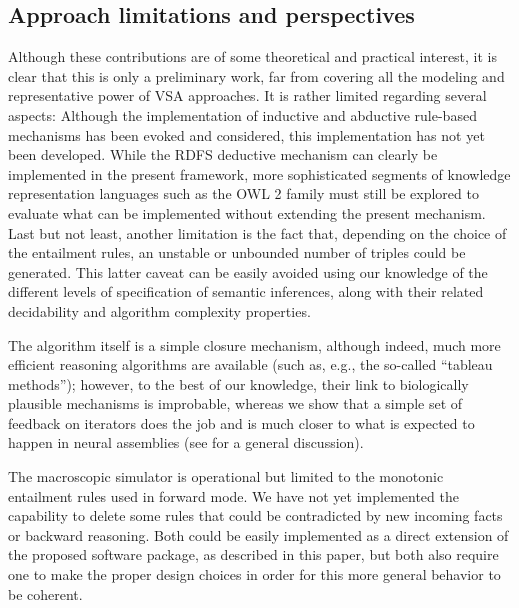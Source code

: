 \documentclass[sn-mathphys]{sn-jnl}
\begin{document}
\subsection{Approach limitations and perspectives}

Although these contributions are of some theoretical and practical interest, it is clear that this is only a preliminary work, far from covering all the modeling and representative power of VSA approaches. It is rather limited regarding several aspects: Although the implementation of inductive and abductive rule-based mechanisms has been evoked and considered, this implementation has not yet been developed. While the RDFS deductive mechanism can clearly be implemented in the present framework, more sophisticated segments of knowledge representation languages such as the OWL 2 family must still be explored to evaluate what can be implemented without extending the present mechanism. Last but not least, another limitation is the fact that, depending on the choice of the entailment rules, an unstable or unbounded number of triples could be generated. This latter caveat can be easily avoided using our knowledge of the different levels of specification of semantic inferences, along with their related decidability and algorithm complexity properties.

The algorithm itself is a simple closure mechanism, although indeed, much more efficient reasoning algorithms are available (such as, e.g., the so-called ``tableau methods''); however, to the best of our knowledge, their link to biologically plausible mechanisms is improbable, whereas we show that a simple set of feedback on iterators does the job and is much closer to what is expected to happen in neural assemblies (see \cite{eliasmith_how_2013} for a general discussion).

The macroscopic simulator is operational but limited to the monotonic entailment rules used in forward mode. We have not yet implemented the capability to delete some rules that could be contradicted by new incoming facts or backward reasoning. Both could be easily implemented as a direct extension of the proposed software package, as described in this paper, but both also require one to make the proper design choices in order for this more general behavior to be coherent.
\end{document}
